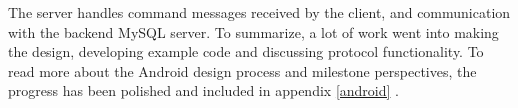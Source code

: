 The server handles command messages received by the client, and communication with the backend MySQL server.
To summarize, a lot of work went into making the design, developing example code and discussing protocol functionality. To read more about the Android design process and milestone perspectives, the progress has been polished and included in appendix \vref{android} .
